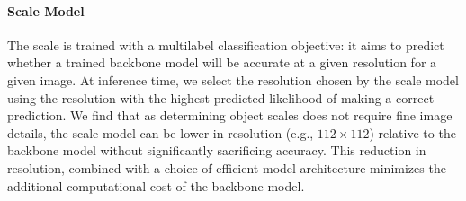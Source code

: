 \paragraph{Scale Model}
The scale is trained with a multilabel classification objective: it aims to predict whether a trained backbone model will be accurate at a given resolution for a given image.
At inference time, we select the resolution chosen by the scale model using the resolution with the highest predicted likelihood of making a correct prediction.
We find that as determining object scales does not require fine image details, the scale model can be lower in resolution (e.g., $112\times112$) relative to the backbone model without significantly sacrificing accuracy.
This reduction in resolution, combined with a choice of efficient model architecture minimizes the additional computational cost of the backbone model.

